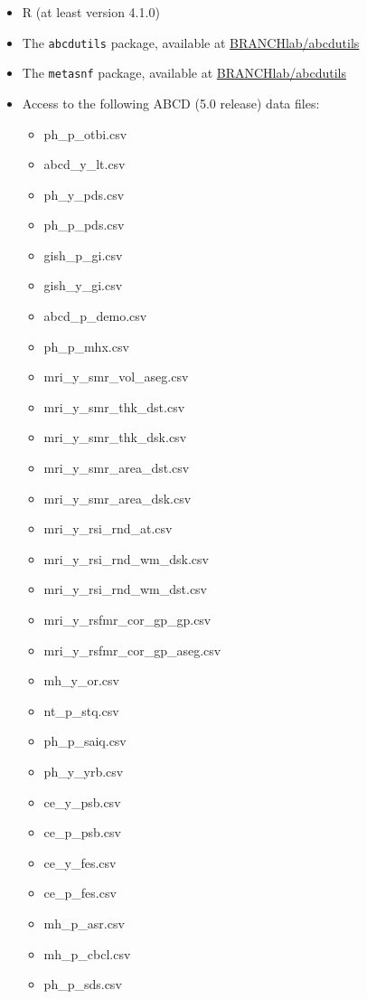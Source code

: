 \documentclass[
  letterpaper,
  DIV=11,
  numbers=noendperiod]{scrreprt}
\providecommand{\tightlist}{%
  \setlength{\itemsep}{0pt}\setlength{\parskip}{0pt}}\usepackage{longtable,booktabs,array}
\begin{document}
\begin{itemize}
\tightlist
\item
  R (at least version 4.1.0)
\item
  The \texttt{abcdutils} package, available at
  \href{https://github.com/BRANCHlab/abcdutils}{BRANCHlab/abcdutils}
\item
  The \texttt{metasnf} package, available at
  \href{https://github.com/BRANCHlab/metasnf}{BRANCHlab/abcdutils}
\item
  Access to the following ABCD (5.0 release) data files:

  \begin{itemize}
  \tightlist
  \item
    ph\_p\_otbi.csv
  \item
    abcd\_y\_lt.csv
  \item
    ph\_y\_pds.csv
  \item
    ph\_p\_pds.csv
  \item
    gish\_p\_gi.csv
  \item
    gish\_y\_gi.csv
  \item
    abcd\_p\_demo.csv
  \item
    ph\_p\_mhx.csv
  \item
    mri\_y\_smr\_vol\_aseg.csv
  \item
    mri\_y\_smr\_thk\_dst.csv
  \item
    mri\_y\_smr\_thk\_dsk.csv
  \item
    mri\_y\_smr\_area\_dst.csv
  \item
    mri\_y\_smr\_area\_dsk.csv
  \item
    mri\_y\_rsi\_rnd\_at.csv
  \item
    mri\_y\_rsi\_rnd\_wm\_dsk.csv
  \item
    mri\_y\_rsi\_rnd\_wm\_dst.csv
  \item
    mri\_y\_rsfmr\_cor\_gp\_gp.csv
  \item
    mri\_y\_rsfmr\_cor\_gp\_aseg.csv
  \item
    mh\_y\_or.csv
  \item
    nt\_p\_stq.csv
  \item
    ph\_p\_saiq.csv
  \item
    ph\_y\_yrb.csv
  \item
    ce\_y\_psb.csv
  \item
    ce\_p\_psb.csv
  \item
    ce\_y\_fes.csv
  \item
    ce\_p\_fes.csv
  \item
    mh\_p\_asr.csv
  \item
    mh\_p\_cbcl.csv
  \item
    ph\_p\_sds.csv
  \end{itemize}
\end{itemize}
\end{document}
